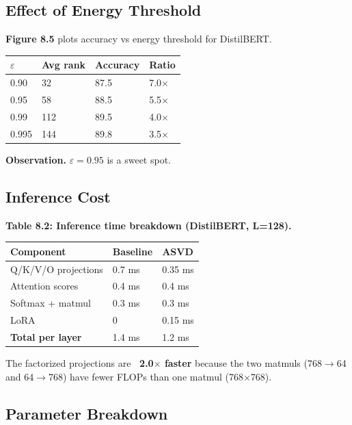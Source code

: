 \subsection{Effect of Energy Threshold}

\textbf{Figure 8.5} plots accuracy vs energy threshold for DistilBERT.

\begin{table}[H]
\centering
\small
\begin{tabular}{llll}
\toprule
\textbf{$\varepsilon$} & \textbf{Avg rank} & \textbf{Accuracy} & \textbf{Ratio} \\
\midrule
0.90 & 32 & 87.5 & 7.0$\times$ \\
0.95 & 58 & 88.5 & 5.5$\times$ \\
0.99 & 112 & 89.5 & 4.0$\times$ \\
0.995 & 144 & 89.8 & 3.5$\times$ \\
\bottomrule
\end{tabular}
\end{table}

\textbf{Observation.} $\varepsilon = 0.95$ is a sweet spot.

\subsection{Inference Cost}

\textbf{Table 8.2: Inference time breakdown (DistilBERT, L=128).}

\begin{table}[H]
\centering
\small
\begin{tabular}{lll}
\toprule
\textbf{Component} & \textbf{Baseline} & \textbf{ASVD} \\
\midrule
Q/K/V/O projections & 0.7 ms & 0.35 ms \\
Attention scores & 0.4 ms & 0.4 ms \\
Softmax + matmul & 0.3 ms & 0.3 ms \\
LoRA & 0 & 0.15 ms \\
\textbf{Total per layer} & 1.4 ms & 1.2 ms \\
\bottomrule
\end{tabular}
\end{table}

The factorized projections are \textbf{~2.0$\times$ faster} because 
the two matmuls (768$\to$64 and 64$\to$768) have fewer FLOPs than one matmul 
(768$\times$768).

\subsection{Parameter Breakdown}

